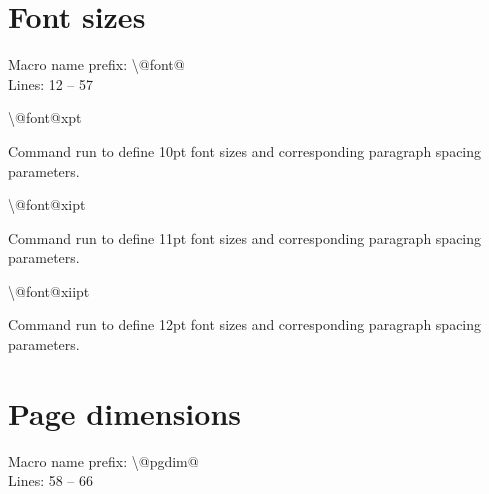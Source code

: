 \documentclass[twoside,openany]{thesis}
\begin{document}
\section{Font sizes}\label{sec:Font sizes}

Macro name prefix: {\ttfamily\textbackslash @font@}\\
Lines: 12 -- 57

\begin{listing}

\item   {\ttfamily\textbackslash @font@xpt}

        Command run to define 10pt font sizes and corresponding paragraph spacing parameters.

\item   {\ttfamily\textbackslash @font@xipt}

        Command run to define 11pt font sizes and corresponding paragraph spacing parameters.

\item   {\ttfamily\textbackslash @font@xiipt}

        Command run to define 12pt font sizes and corresponding paragraph spacing parameters.

\end{listing}

\clearpage

\section{Page dimensions}\label{sec:Page dimensions}

Macro name prefix: {\ttfamily\textbackslash @pgdim@}\\
Lines: 58 -- 66
\end{document}

